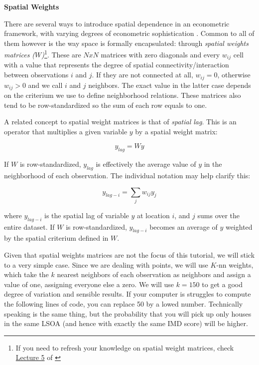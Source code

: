 \documentclass[
]{book}
\begin{document}
\textbf{Spatial Weights}

There are several ways to introduce spatial dependence in an econometric framework, with varying degrees of econometric sophistication \citep[see][ for a good overview]{anselin2003spatial}. Common to all of them however is the way space is formally encapsulated: through \emph{spatial weights matrices (\(W\))}\footnote{If you need to refresh your knowledge on spatial weight matrices, check \href{http://darribas.org/gds15/notes/Class_05.html}{Lecture 5} of \citet{darribas_gds15}}. These are \(NxN\) matrices with zero diagonals and every \(w_{ij}\) cell with a value that represents the degree of spatial connectivity/interaction between observations \(i\) and \(j\). If they are not connected at all, \(w_{ij}=0\), otherwise \(w_{ij}>0\) and we call \(i\) and \(j\) neighbors. The exact value in the latter case depends on the criterium we use to define neighborhood relations. These matrices also tend to be row-standardized so the sum of each row equals to one.

A related concept to spatial weight matrices is that of \emph{spatial lag}. This is an operator that multiplies a given variable \(y\) by a spatial weight matrix:

\[
y_{lag} = W y
\]

If \(W\) is row-standardized, \(y_{lag}\) is effectively the average value of \(y\) in the neighborhood of each observation. The individual notation may help clarify this:

\[
y_{lag-i} = \displaystyle \sum_j w_{ij} y_j
\]

where \(y_{lag-i}\) is the spatial lag of variable \(y\) at location \(i\), and \(j\) sums over the entire dataset. If \(W\) is row-standardized, \(y_{lag-i}\) becomes an average of \(y\) weighted by the spatial criterium defined in \(W\).

Given that spatial weights matrices are not the focus of this tutorial, we will stick to a very simple case. Since we are dealing with points, we will use \(K\)-nn weights, which take the \(k\) nearest neighbors of each observation as neighbors and assign a value of one, assigning everyone else a zero. We will use \(k=150\) to get a good degree of variation and sensible results. If your computer is struggles to compute the following lines of code, you can replace 50 by a lowed number. Technically speaking is the same thing, but the probability that you will pick up only houses in the same LSOA (and hence with exactly the same IMD score) will be higher.
\end{document}
